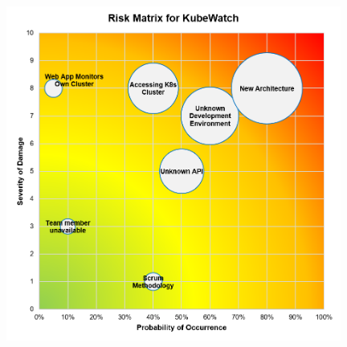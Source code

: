 \begin{figure}[h]
    \centering
    \includegraphics[width=11cm]{resources/risk_matrix.png}
    \label{fig:risk-matrix}
\end{figure}


